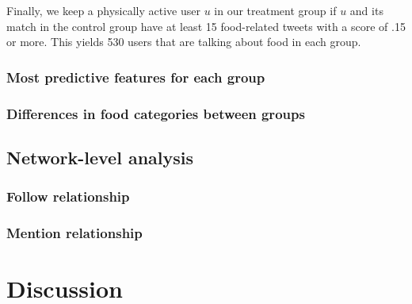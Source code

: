 \documentclass[letterpaper]{article}
\begin{document}
Finally, we keep a physically active user $u$ in our treatment group if $u$ and
its match in the control group have at least 15 food-related tweets with a score
of .15 or more. This yields 530 users that are talking about food in each group.

\subsubsection{Most predictive features for each group}

\subsubsection{Differences in food categories between groups}


\subsection{Network-level analysis}

\subsubsection{Follow relationship}

\subsubsection{Mention relationship}

\section{Discussion}



\end{document}
